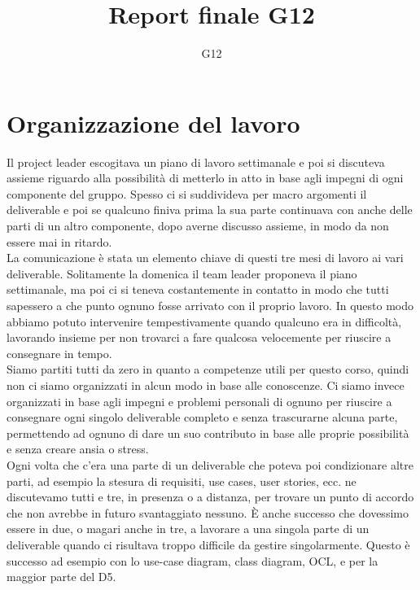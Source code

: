 \documentclass{article}
\author{G12}
\title{Report finale G12}
\date{}
\begin{document}
   \maketitle 
   \tableofcontents
   \clearpage  
   \section{Organizzazione del lavoro}
   Il project leader escogitava un piano di lavoro settimanale e poi si discuteva assieme riguardo alla possibilità di metterlo in atto in base agli impegni di ogni componente del gruppo. Spesso ci si suddivideva per macro argomenti il deliverable e poi se qualcuno finiva prima la sua parte continuava con anche delle parti di un altro componente, dopo averne discusso assieme, in modo da non essere mai in ritardo.\\
   La comunicazione è stata un elemento chiave di questi tre mesi di lavoro ai vari deliverable. Solitamente la domenica il team leader proponeva il piano settimanale, ma poi ci si teneva costantemente in contatto in modo che tutti sapessero a che punto ognuno fosse arrivato con il proprio lavoro. In questo modo abbiamo potuto intervenire tempestivamente quando qualcuno era in difficoltà, lavorando insieme per non trovarci a fare qualcosa velocemente per riuscire a consegnare in tempo.\\
   Siamo partiti tutti da zero in quanto a competenze utili per questo corso, quindi non ci siamo organizzati in alcun modo in base alle conoscenze. Ci siamo invece organizzati in base agli impegni e problemi personali di ognuno per riuscire a consegnare ogni singolo deliverable completo e senza trascurarne alcuna parte, permettendo ad ognuno di dare un suo contributo in base alle proprie possibilità e senza creare ansia o stress.\\
   Ogni volta che c’era una parte di un deliverable che poteva poi condizionare altre parti, ad esempio la stesura di requisiti, use cases, user stories, ecc. ne discutevamo tutti e tre, in presenza o a distanza, per trovare un punto di accordo che non avrebbe in futuro svantaggiato nessuno.
   È anche successo che dovessimo essere in due, o magari anche in tre, a lavorare a una singola parte di un deliverable quando ci risultava troppo difficile da gestire singolarmente. Questo è successo ad esempio con lo use-case diagram, class diagram, OCL, e per la maggior parte del D5.
\end{document}
